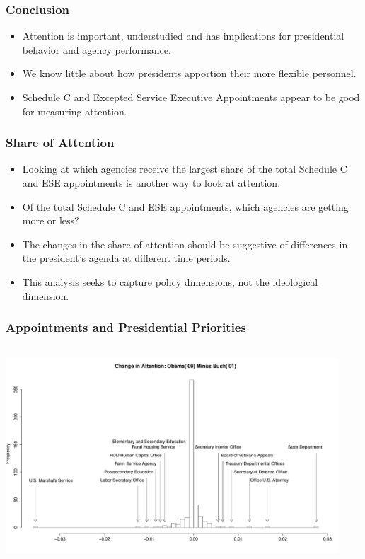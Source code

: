\documentclass{beamer}
\begin{document}
\begin{frame}[fragile]
\frametitle{Conclusion}
\begin{itemize}\addtolength{\itemsep}{1.5\baselineskip}
\item Attention is important, understudied and has implications for presidential behavior and agency performance. 
\item We know little about how presidents apportion their more flexible personnel.
\item Schedule C and Excepted Service Executive Appointments appear to be good for measuring attention.
\end{itemize}
\end{frame}

\begin{frame}[fragile]
\frametitle{Share of Attention}

\begin{itemize}\addtolength{\itemsep}{1\baselineskip}
\item Looking at which agencies receive the largest share of the total Schedule C and ESE appointments is another way to look at attention. 
\item Of the total Schedule C and ESE appointments, which agencies are getting more or less?
\item The changes in the share of attention should be suggestive of differences in the president's agenda at different time periods.
\item This analysis seeks to capture policy dimensions, not the ideological dimension.

\end{itemize}
\end{frame}

\begin{frame}[fragile]
\frametitle{Appointments and Presidential Priorities}
\includegraphics[height=3.2in,width=4.9in]{AttentionChange01to09.pdf}
\end{frame}
\end{document}
